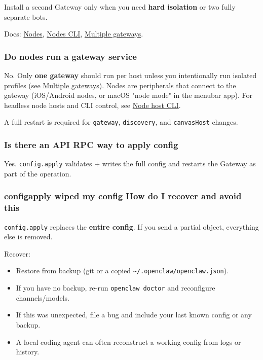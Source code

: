 Install a second Gateway only when you need \textbf{hard isolation} or two fully separate bots.

Docs: \href{/nodes}{Nodes}, \href{/cli/nodes}{Nodes CLI}, \href{/gateway/multiple-gateways}{Multiple gateways}.

\subsubsection{Do nodes run a gateway service}


No. Only \textbf{one gateway} should run per host unless you intentionally run isolated profiles (see \href{/gateway/multiple-gateways}{Multiple gateways}). Nodes are peripherals that connect
to the gateway (iOS/Android nodes, or macOS "node mode" in the menubar app). For headless node
hosts and CLI control, see \href{/cli/node}{Node host CLI}.

A full restart is required for \texttt{gateway}, \texttt{discovery}, and \texttt{canvasHost} changes.

\subsubsection{Is there an API RPC way to apply config}


Yes. \texttt{config.apply} validates + writes the full config and restarts the Gateway as part of the operation.

\subsubsection{configapply wiped my config How do I recover and avoid this}


\texttt{config.apply} replaces the \textbf{entire config}. If you send a partial object, everything
else is removed.

Recover:

\begin{itemize}
  \item Restore from backup (git or a copied \texttt{\textasciitilde{}/.openclaw/openclaw.json}).
  \item If you have no backup, re-run \texttt{openclaw doctor} and reconfigure channels/models.
  \item If this was unexpected, file a bug and include your last known config or any backup.
  \item A local coding agent can often reconstruct a working config from logs or history.
\end{itemize}



